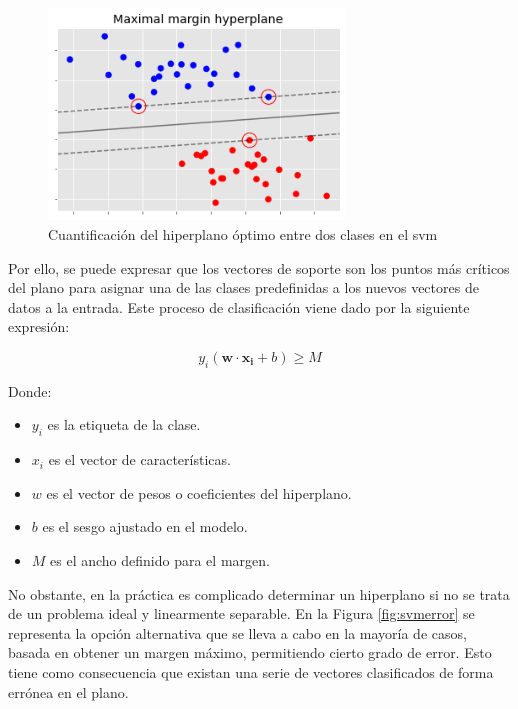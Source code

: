 \vspace{3mm}

\begin{figure}[h!]
    \centering
    \includegraphics[width=0.7\textwidth]{img/teoria/svm.png}
    \caption{Cuantificación del hiperplano óptimo entre dos clases en el \acrshort{svm} \cite{svmciencia}}
    \label{fig:svm}
\end{figure}

\vspace{3mm}

Por ello, se puede expresar que los vectores de soporte son los puntos más críticos del plano para asignar una de las clases predefinidas a los nuevos vectores de datos a la entrada. Este proceso de clasificación viene dado por la siguiente expresión: \cite{svmmedium} 

\[ y_i(\mathbf{w} \cdot \mathbf{x_i} + b) \geq M\]

    Donde:
\begin{itemize}
    \renewcommand{\labelitemi}{}
    \item \(y_i\) es la etiqueta de la clase. 
    \item \(x_i\) es el vector de características.
    \item \(w\) es el vector de pesos o coeficientes del hiperplano.
    \item \(b\) es el sesgo ajustado en el modelo.
    \item \(M\) es el ancho definido para el margen.
\end{itemize}

\vspace{3mm}

No obstante, en la práctica es complicado determinar un hiperplano si no se trata de un problema ideal y linearmente separable. En la Figura \ref{fig:svmerror} se representa la opción alternativa que se lleva a cabo en la mayoría de casos, basada en obtener un margen máximo, permitiendo cierto grado de error. Esto tiene como consecuencia que existan una serie de vectores clasificados de forma errónea en el plano. \cite{svmmedium} \cite{matlab}

